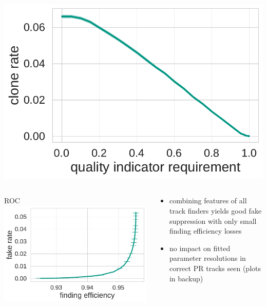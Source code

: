 \documentclass[18pt, aspectratio=169]{beamer}
\begin{document}
\begin{frame}
\begin{columns}
\begin{column}{.33\textwidth}
      \includegraphics[width=\textwidth]{figures/combined-qi/fullqi_clone_rate.pdf}
    \end{column}
  \end{columns}
  \begin{columns}
    \begin{column}{.4\textwidth}
      \centering
      ROC
      \includegraphics[width=\textwidth]{figures/combined-qi/fullqi_roc_curve.pdf}
    \end{column}
    \begin{column}{.7\textwidth}
      \begin{itemize}
      \item combining features of all track finders yields good fake suppression with only small
        finding efficiency losses
      \item no impact on fitted parameter resolutions in correct PR tracks seen (plots in backup)
      \end{itemize}
    \end{column}
  \end{columns}
\end{frame}
\end{document}
